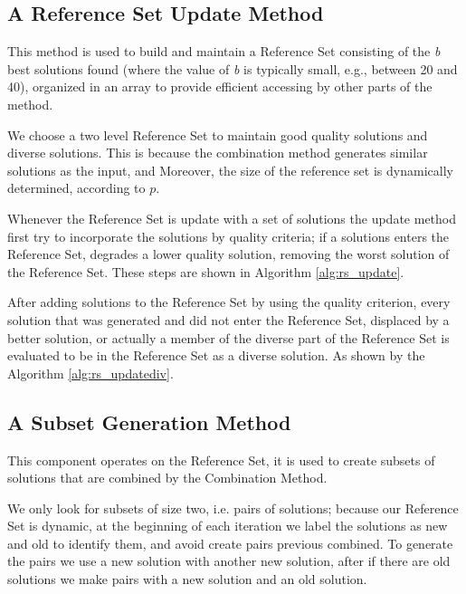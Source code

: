\subsection{A Reference Set Update Method}
This method is used
to build and maintain a Reference Set
consisting of the \textit{b} best solutions found
(where the value of \textit{b}
is typically small,
e.g., between 20 and 40),
organized in an array
to provide efficient accessing
by other parts of the method.

We choose
a two level Reference Set
to maintain
good quality solutions
and diverse solutions.
This is
because the combination method
generates similar solutions as the input,
and Moreover,
the size of the reference set is dynamically determined,
according to $p$.

Whenever the Reference Set is update
with a set of solutions
the update method
first try to incorporate the solutions
by quality criteria;
if a solutions enters the Reference Set,
degrades a lower quality solution,
removing the worst solution of the Reference Set.
These steps are shown in Algorithm \ref{alg:rs_update}.


After adding solutions to the Reference Set
by using the quality criterion,
every solution that was generated
and did not enter the Reference Set,
displaced by a better solution,
or actually
a member of the diverse part of the Reference Set
is evaluated to be in the Reference Set
as a diverse solution.
As shown by the Algorithm \ref{alg:rs_updatediv}.

%

\subsection{A Subset Generation Method}
This component operates on the Reference Set,
it is used to create subsets
of solutions that are combined
by the Combination Method.

We only look for subsets of size two,
i.e. pairs of solutions;
because our Reference Set is dynamic,
at the beginning of each iteration
we label the solutions as new and old
to identify them,
and avoid create pairs previous combined.
To generate the pairs
we use
a new solution with another new solution,
after
if there are old solutions
we make pairs
with a new solution
and an old solution.

